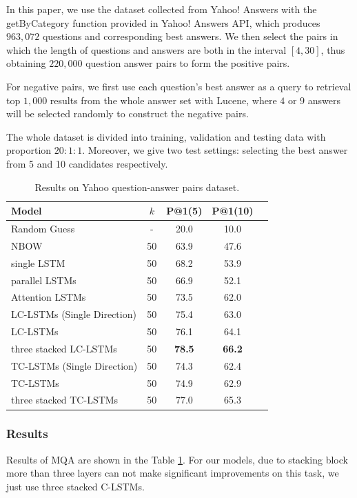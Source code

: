 \documentclass{article}
\begin{document}
In this paper, we use the dataset collected  from Yahoo! Answers with the getByCategory function provided in Yahoo! Answers API, which produces $963,072$ questions and corresponding best answers. We then select the pairs in which the length of questions and answers are both in the interval $[4,30]$, thus obtaining $220,000$ question answer pairs to form the positive pairs.

For negative pairs, we first use each question's best answer as a query to retrieval top $1,000$ results from the whole answer set with Lucene, where $4$ or $9$ answers will be selected randomly to construct the negative pairs.

The whole dataset is divided into training, validation and testing data with proportion $20:1:1$. Moreover, we give two test settings: selecting the best answer from 5 and 10 candidates respectively.


\begin{table}[!t]\small
\center
\begin{tabular}{|l|*{4}{c|}}
\hline
\textbf{Model} & $k$  & P@1(5) & P@1(10) \\ \hline
Random Guess & - & 20.0 & 10.0 \\
NBOW & 50 &  63.9 & 47.6 \\
single LSTM  & 50 &  68.2 & 53.9 \\
parallel LSTMs & 50 &  66.9 & 52.1 \\
Attention LSTMs & 50 &  73.5 & 62.0 \\\hline
LC-LSTMs (Single Direction) & 50 &  75.4 & 63.0 \\
LC-LSTMs & 50 &  76.1 & 64.1 \\
three stacked LC-LSTMs & 50 &  \textbf{78.5} & \textbf{66.2} \\ \hline

TC-LSTMs (Single Direction) & 50 &  74.3 & 62.4 \\
TC-LSTMs & 50 &  74.9 & 62.9 \\
three stacked TC-LSTMs & 50 &  77.0 & 65.3 \\ \hline
\end{tabular}
\caption{Results on Yahoo question-answer pairs dataset.}\label{tab:res-exp1}
\end{table}

\subsubsection{Results}
Results of MQA are shown in the Table \ref{tab:res-exp1}. For our models,  due to stacking block more than three layers can not make significant improvements on this task, we just use three stacked C-LSTMs.
\end{document}
